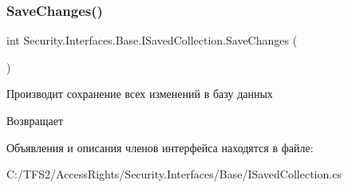 \subsubsection{\texorpdfstring{Save\+Changes()}{SaveChanges()}}
{\footnotesize\ttfamily int Security.\+Interfaces.\+Base.\+I\+Saved\+Collection.\+Save\+Changes (\begin{DoxyParamCaption}{ }\end{DoxyParamCaption})}



Производит сохранение всех изменений в базу данных 

\begin{DoxyReturn}{Возвращает}

\end{DoxyReturn}


Объявления и описания членов интерфейса находятся в файле\+:\begin{DoxyCompactItemize}
\item 
C\+:/\+T\+F\+S2/\+Access\+Rights/\+Security.\+Interfaces/\+Base/I\+Saved\+Collection.\+cs\end{DoxyCompactItemize}
